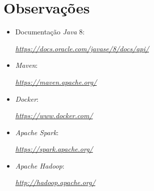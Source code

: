 \documentclass[a4paper]{report}
\begin{document}
\appendix
\chapter{Observações} \label{ch:Observations}
\begin{itemize}
    \item Documentação \textit{Java} 8:
    \par \textit{\url{https://docs.oracle.com/javase/8/docs/api/}}
    \item \textit{Maven}:
    \par \textit{\url{https://maven.apache.org/}}
    \item \textit{Docker}:
    \par \textit{\url{https://www.docker.com/}}
    \item \textit{Apache Spark}:
    \par \textit{\url{https://spark.apache.org/}}
    \item \textit{Apache Hadoop}:
    \par \textit{\url{http://hadoop.apache.org/}}
\end{itemize}
\end{document}

